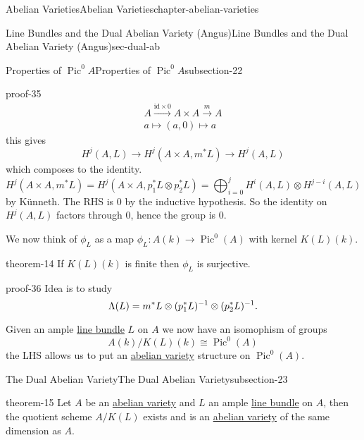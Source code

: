 \documentclass[oneside,10pt,]{book}
\renewcommand{\qedhere}{\relax}
\numberwithin{equation}{section}
\newcommand{\id}{\mathrm{id}}
\DeclareMathOperator{\Pic}{Pic}
\begin{document}
\begin{chapterptx}{Abelian Varieties}{}{Abelian Varieties}{}{}{chapter-abelian-varieties}
\begin{sectionptx}{Line Bundles and the Dual Abelian Variety (Angus)}{}{Line Bundles and the Dual Abelian Variety (Angus)}{}{}{sec-dual-ab}
\begin{subsectionptx}{Properties of \(\Pic^0 A\)}{}{Properties of \(\Pic^0 A\)}{}{}{subsection-22}
\begin{proofptx}{}{proof-35}
\begin{gather*}
A\xrightarrow{\id \times 0} A\times A \xrightarrow m A\\
a\mapsto (a,0)\mapsto a
\end{gather*}
this gives%
\begin{equation*}
H^j(A, L) \to H^j(A\times A, m^*L) \to H^j(A,L)
\end{equation*}
which composes to the identity.%
\begin{equation*}
H^j(A\times A, m^*L) =  H^j(A\times A, p_1^*L \otimes p_2^*L) = \bigoplus_{i=0}^j H^i(A,L) \otimes H^{j-i}(A,L)
\end{equation*}
by Künneth. The RHS is 0 by the inductive hypothesis. So the identity on \(H^j(A,L)\) factors through 0, hence the group is 0.%
\end{proofptx}
\hypertarget{p-186}{}%
We now think of \(\phi_L\) as a map \(\phi_L \colon A(k) \to \Pic^0(A)\) with kernel \(K(L) (k)\).%
\begin{theorem}{}{}{theorem-14}%
\hypertarget{p-187}{}%
If \(K(L)(k)\) is finite then \(\phi_L\) is surjective.%
\end{theorem}
\begin{proofptx}{}{proof-36}
\hypertarget{p-188}{}%
Idea is to study%
\begin{equation*}
\Lambda (L) =  m^* L \otimes (p_1^* L)^{-1} \otimes (p_2^* L)^{-1}\text{.}\qedhere
\end{equation*}
%
\end{proofptx}
\hypertarget{p-189}{}%
Given an ample \hyperref[def-line-bundle]{line bundle} \(L\) on \(A\) we now have an isomophism of groups%
\begin{equation*}
A(k)/K(L)(k) \cong \Pic^0(A)
\end{equation*}
the LHS allows us to put an \hyperref[def-buntes-abvar]{abelian variety} structure on \(\Pic^0(A)\).%
\end{subsectionptx}
%
%
\typeout{************************************************}
\typeout{************************************************}
%
\begin{subsectionptx}{The Dual Abelian Variety}{}{The Dual Abelian Variety}{}{}{subsection-23}
\begin{theorem}{}{}{theorem-15}%
\hypertarget{p-190}{}%
Let \(A\) be an \hyperref[def-buntes-abvar]{abelian variety} and \(L\) an ample \hyperref[def-line-bundle]{line bundle} on \(A\), then the quotient scheme \(A/K(L)\) exists and is an \hyperref[def-buntes-abvar]{abelian variety} of the same dimension as \(A\).%

\end{theorem}
\end{subsectionptx}
\end{sectionptx}
\end{chapterptx}
\end{document}
